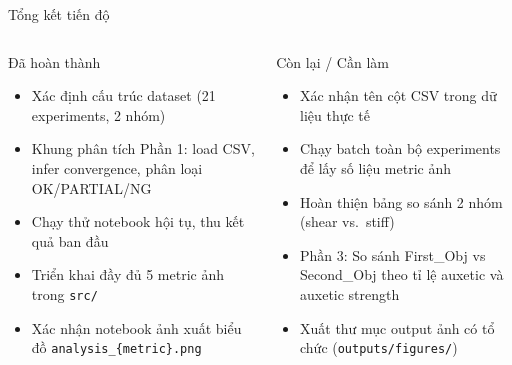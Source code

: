 \documentclass[aspectratio=169,11pt]{beamer}
\begin{document}
\begin{frame}{Tổng kết tiến độ}
  \begin{columns}[T, onlytextwidth]
      \begin{block}{\textcolor{okgreen}{Đã hoàn thành}}
        \small
        \begin{itemize}
          \item[\checkmark] Xác định cấu trúc dataset (21 experiments,
                2 nhóm)
          \item[\checkmark] Khung phân tích Phần 1: load CSV, infer
                convergence, phân loại OK/PARTIAL/NG
          \item[\checkmark] Chạy thử notebook hội tụ, thu kết quả
                ban đầu
          \item[\checkmark] Triển khai đầy đủ 5 metric ảnh trong
                \texttt{src/}
          \item[\checkmark] Xác nhận notebook ảnh xuất biểu đồ
                \texttt{analysis\_\{metric\}.png}
        \end{itemize}
      \end{block}
      \begin{alertblock}{Còn lại / Cần làm}
        \small
        \begin{itemize}
          \item[$\square$] Xác nhận tên cột CSV trong dữ liệu thực tế
          \item[$\square$] Chạy batch toàn bộ experiments để lấy
                số liệu metric ảnh
          \item[$\square$] Hoàn thiện bảng so sánh 2 nhóm
                (shear vs.\ stiff)
          \item[$\square$] Phần 3: So sánh First\_Obj vs Second\_Obj
                theo tỉ lệ auxetic và auxetic strength
          \item[$\square$] Xuất thư mục output ảnh có tổ chức
                (\texttt{outputs/figures/})
        \end{itemize}
      \end{alertblock}
  \end{columns}
\end{frame}
\end{document}
